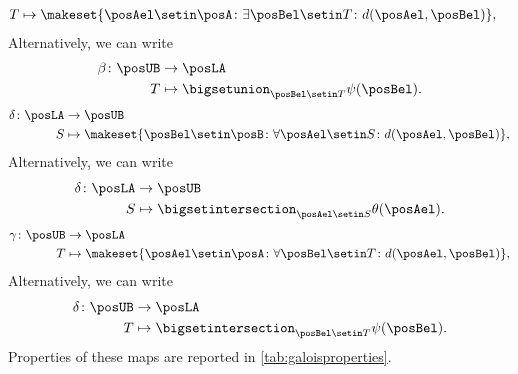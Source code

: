 {\begin{equation}
\begin{aligned}
        T                  & \mapsto \makeset{\posAel\setin \posA  \colon \exists \posBel\setin T\colon d(\posAel,\posBel)},
    \end{aligned}
\end{equation}
%
\noindent Alternatively, we can write
\begin{equation}
    \begin{aligned}
        \beta \colon \posUB & \to \posLA \\
        T                   & \mapsto \bigsetunion_{\posBel\setin T} \psi(\posBel).
    \end{aligned}
\end{equation}
%
\begin{equation}
    \label{eq:galoisdelta}
    \begin{aligned}
        \delta \colon \posLA & \to \posUB \\
        S                    & \mapsto \makeset{\posBel\setin \posB \colon \forall {\posAel\setin S}\colon d(\posAel,\posBel)},
    \end{aligned}
\end{equation}
Alternatively, we can write
\begin{equation}
    \begin{aligned}
        \delta\colon \posLA & \to \posUB \\
        S                   & \mapsto \bigsetintersection_{\posAel\setin S}\theta(\posAel).
    \end{aligned}
\end{equation}
%
\begin{equation}
    \label{eq:galoisgamma}
    \begin{aligned}
        \gamma \colon \posUB & \to \posLA \\
        T                    & \mapsto \makeset{\posAel\setin \posA \colon \forall {\posBel\setin T}\colon d(\posAel,\posBel)},
    \end{aligned}
\end{equation}
Alternatively, we can write
\begin{equation}
    \begin{aligned}
        \delta\colon \posUB & \to \posLA \\
        T                   & \mapsto \bigsetintersection_{\posBel\setin T}\psi(\posBel).
    \end{aligned}
\end{equation}
%
Properties of these maps are reported in \cref{tab:galoisproperties}.

}
